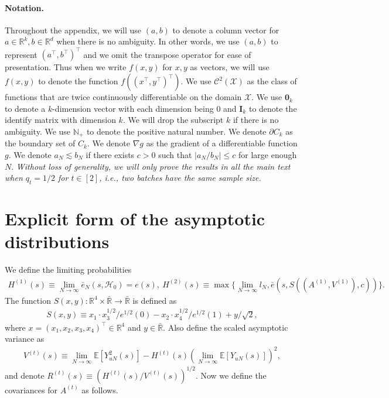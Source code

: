 \documentclass[12pt]{article}
\newcommand{\E}{\mathbb E}								%
\begin{document}
\renewcommand{\contentsname}{Appendix}


\tableofcontents

\paragraph{Notation.}
Throughout the appendix, we will use $(a,b)$ to denote a column vector for $a\in\mathbb{R}^{k},b\in \mathbb{R}^{d}$ when there is no ambiguity. In other words, we use $(a,b)$ to represent $(a^\top,b^\top)^\top$ and we omit the transpose operator for ease of presentation. Thus when we write $f(x,y)$ for $x,y$ as vectors, we will use $f(x,y)$ to denote the function $f((x^\top,y^\top)^\top)$. We use $\mathcal{C}^2(\mathcal{X})$ as the class of functions that are twice continuously differentiable on the domain $\mathcal{X}$. We use $\bm 0_k$ to denote a $k$-dimension vector with each dimension being $0$ and $\bm I_k$ to denote the identify matrix with dimension $k$. We will drop the subscript $k$ if there is no ambiguity. We use $\mathbb{N}_{+}$ to denote the positive natural number. We denote $\partial C_k$ as the boundary set of $C_k$. We denote $\nabla g$ as the gradient of a differentiable function $g$. We denote $a_N\lesssim b_N$ if there exists $c>0$ such that $|a_N/b_N|\leq c$ for large enough $N$. 
\textit{Without loss of generality, we will only prove the results in all the main text when $q_t=1/2$ for $t\in[2]$, i.e., two batches have the same sample size.} 


\section{Explicit form of the asymptotic distributions}\label{sec:explicit_form_asymptotic_distribution}


We define the limiting probabilities 
\small
\begin{align}\label{eq:limiting_probabilities}
	H^{(1)}(s)\equiv \lim_{N\rightarrow\infty}\bar e_N(s,\mathcal{H}_0)=e(s),~
	H^{(2)}(s)\equiv \max\Big\{\lim_{N\rightarrow\infty}l_N, \bar e(s,S((A^{(1)},V^{(1)}),c))\Big\}.
\end{align}
\normalsize
The function $S(x,y):\mathbb{R}^{4}\times \bar{\mathbb{R}}\rightarrow\bar{\mathbb{R}}$ is defined as 
\begin{align}\label{eq:def_h_function}
	S(x,y)\equiv x_1\cdot x_3^{1/2}/e^{1/2}(0)-x_2\cdot x_4^{1/2}/e^{1/2}(1)+y/\sqrt{2},
\end{align}
where $x=(x_1,x_2,x_3,x_4)^\top\in\mathbb{R}^4$ and $y\in \bar{\mathbb{R}}$.  Also define the scaled asymptotic variance as 
\begin{align}\label{eq:limiting_variance}
	V^{(t)}(s) \equiv \lim_{N\rightarrow\infty}\E[Y_{uN}^2(s)]-H^{(t)}(s)(\lim_{N\rightarrow\infty}\E[Y_{uN}(s)])^2,
\end{align}
and denote $R^{(t)}(s)\equiv (H^{(t)}(s)/V^{(t)}(s))^{1/2}$. Now we define the covariances for $A^{(t)}$ as follows.
\end{document}
